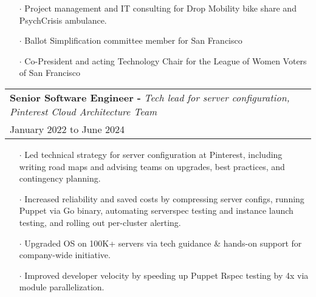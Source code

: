 \documentclass[letterpaper, oneside, final]{scrartcl} %
\begin{document}
\begin{center}
\begin{itemize}
\item[$\cdot$] Project management and IT consulting for Drop Mobility bike share and PsychCrisis ambulance.\\[10pt]
\item[$\cdot$] Ballot Simplification committee member for San Francisco\\[10pt]
\item[$\cdot$] Co-President and acting Technology Chair for the League of Women Voters of San Francisco\\[10pt]

\end{itemize}

\begingroup\setlength{\fboxsep}{0pt}
\colorbox{mygray}{
\begin{flushleft}
\begin{tabularx}{\textwidth}{l}
\textbf{Senior Software Engineer -} \textit{Tech lead for server configuration, Pinterest Cloud Architecture Team}\\
January 2022 to June 2024\\
\end{tabularx}
\end{flushleft}
}\endgroup
\vspace{-0.1cm}
\begin{itemize} \itemsep-0.2cm


\item[$\cdot$] Led technical strategy for server configuration at Pinterest, including writing road maps and advising teams on upgrades, best practices, and contingency planning.\\[10pt]
\item[$\cdot$] Increased reliability and saved costs by compressing server configs, running Puppet via Go binary, automating serverspec testing and instance launch testing, and rolling out per-cluster alerting.\\[10pt]
\item[$\cdot$] Upgraded OS on 100K+ servers via tech guidance \& hands-on support for company-wide initiative.\\[10pt]
\item[$\cdot$] Improved developer velocity by speeding up Puppet Rspec testing by 4x via module parallelization.\\[10pt]


\end{itemize}



\end{center}
\end{document}
